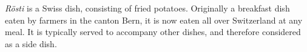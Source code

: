 \emph{R\"osti} is a Swiss dish, consisting of fried potatoes.
Originally a breakfast dish eaten by farmers in the canton Bern, it is now eaten all over Switzerland at any meal.
It is typically served to accompany other dishes, and therefore considered as a side dish.
